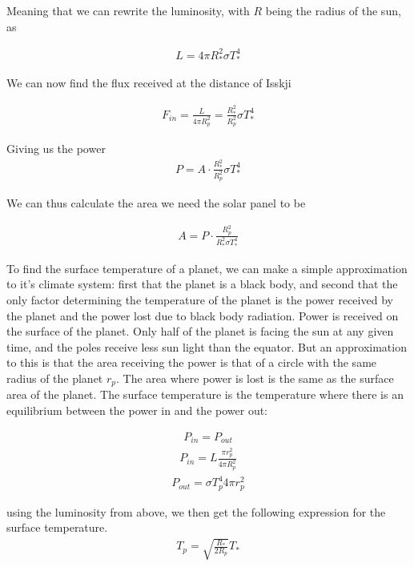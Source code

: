 \documentclass[a4paper, 10pt]{article}
\begin{document}
Meaning that we can rewrite the luminosity, with $R$ being the radius of the sun, as

\begin{align}
L = 4\pi R_*^2 \sigma T_*^4
\end{align}

We can now find the flux received at the distance of Isskji


\begin{align}
F_{in} = \frac{L}{4\pi R_p^2} = \frac{R_*^2}{R_p^2} \sigma T_*^4
\end{align}

Giving us the power
\begin{align}
P = A \cdot \frac{R_*^2}{R_p^2} \sigma T_*^4
\end{align}

We can thus calculate the area we need the solar panel to be

\begin{align}
A = P \cdot \frac{R_p^2}{R_*^2 \sigma T_*^4} 
\end{align}

To find the surface temperature of a planet, we can make a simple approximation to it's climate system: first that the planet is a black body, and second that the only factor determining the temperature of the planet is the power received by the planet and the power lost due to black body radiation. Power is received on the surface of the planet. Only half of the planet is facing the sun at any given time, and the poles receive less sun light than the equator. But an approximation to this is that the area receiving the power is that of a circle with the same radius of the planet $r_p$. The area where power is lost is the same as the surface area of the planet. The surface temperature is the temperature where there is an equilibrium between the power in and the power out:

\begin{align}
P_{in} = P_{out}
\end{align}
\begin{align}
 P_{in} = L \frac{\pi r_p^2}{4\pi R_p^2}
\end{align}
\begin{align}
 P_{out} = \sigma T_p^4 4\pi r_p^2
\end{align}

using the luminosity from above, we then get the following expression for the surface temperature.
\begin{align}
 T_p = \sqrt{\frac{R_*}{2R_p}}T_*
\end{align}
\end{document}
